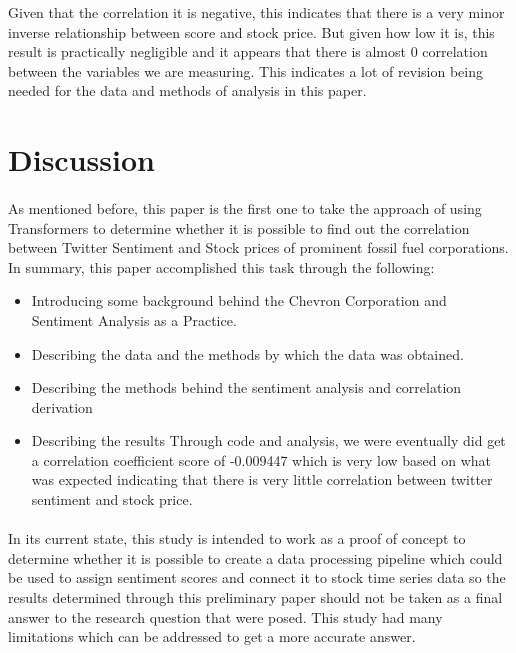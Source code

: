 \documentclass[12pt, letterpaper, titlepage]{article}
\begin{document}
Given that the correlation it is negative, this indicates that there is a very minor inverse relationship between score and stock price. But given how low it is, this result is practically negligible and it appears that there is almost 0 correlation between the variables we are measuring. This indicates a lot of revision being needed for the data and methods of analysis in this paper.
\label{sec: discussion}
\section{Discussion}
\paragraph{}
	As mentioned before, this paper is the first one to take the approach of using Transformers to determine whether it is possible to find out the correlation between Twitter Sentiment and Stock prices of prominent fossil fuel corporations. In summary, this paper accomplished this task through the following:
\begin{itemize}
    \item Introducing some background behind the Chevron Corporation and Sentiment Analysis as a Practice.
    \item Describing the data and the methods by which the data was obtained.
    \item Describing the methods behind the sentiment analysis and correlation derivation
    \item Describing the results
    Through code and analysis, we were eventually did get a correlation coefficient score of -0.009447 which is very low based on what was expected indicating that there is very little correlation between twitter sentiment and stock price.

\end{itemize}
\paragraph{}
	In its current state, this study is intended to work as a proof of concept to determine whether it is possible to create a data processing pipeline which could be used to assign sentiment scores and connect it to stock time series data so the results determined through this preliminary paper should not be taken as a final answer to the research question that were posed. This study had many limitations which can be addressed to get a more accurate answer. 
\end{document}
